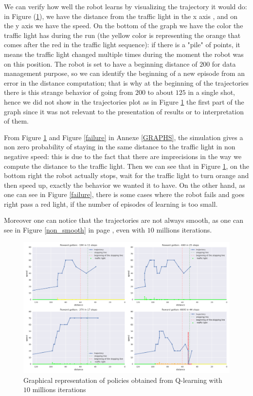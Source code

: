 \documentclass[14pt,a4paper]{article}
\theoremstyle{definition}
\begin{document}
We can verify how well the robot learns by visualizing the trajectory it would do: in Figure (\ref{trajectories}), we have the distance from the traffic light in the x axis , and on the y axis we have the speed. On the bottom of the graph we have the color the traffic light has during the run (the yellow color is representing the orange that comes after the red in the traffic light sequence): if there is a "pile" of points, it means the traffic light changed multiple times during the moment the robot was on this position. The robot is set to have a beginning distance of $200$ for data management purpose, so we can identify the beginning of a new episode from an error in the distance computation; that is why at the beginning of the trajectories there is this strange behavior of going from $200$ to about $125$ in a single shot, hence we did not show in the trajectories plot as in Figure \ref{trajectories} the first part of the graph since it was not relevant to the presentation of results or to interpretation of them.

From Figure \ref{trajectories} and Figure \ref{failure} in Annexe \ref{GRAPHS}, the simulation gives a non zero probability of staying in the same distance to the traffic light in non negative speed: this is due to the fact that there are imprecisions in the way we compute the distance to the traffic light. Then we can see that in Figure \ref{trajectories}, on the bottom right the robot actually stops, wait for the traffic light to turn orange and then speed up, exactly the behavior we wanted it to have. On the other hand, as one can see in Figure \ref{failure}, there is some cases where the robot fails and goes right pass a red light, if the number of episodes of learning is too small.

Moreover one can notice that the trajectories are not always smooth, as one can see in Figure \ref{non_smooth} in page \pageref{non_smooth}, even with $10$ millions iterations.

\begin{figure}[H]
\centering
\includegraphics[scale=0.4]{img/traj_5m.png}
\caption{Graphical representation of policies obtained from Q-learning with $10$ millions  iterations}
\label{trajectories}
\end{figure}
\end{document}
